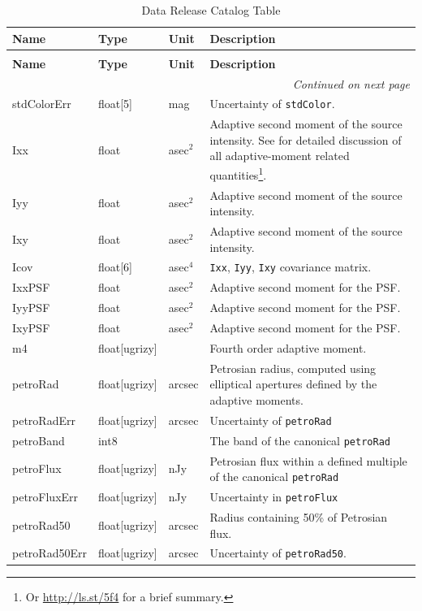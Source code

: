 \documentclass[SE,lsstdraft,toc]{lsstdoc}
\newenvironment{schema}[3]{%
\setlength\LTleft{0pt}
\setlength\LTright{\fill}
\begin{longtable}{p{0.2\textwidth}p{0.14\textwidth}p{0.14\textwidth}p{0.41\textwidth}}

\caption[#1]{#2\label{#3}}\\

\hline \textbf{Name} & \textbf{Type} & \textbf{Unit} & \textbf{Description}\\ \hline
\endfirsthead

\caption[#1]{#2}\\

\hline \textbf{Name} & \textbf{Type} & \textbf{Unit} & \textbf{Description}\\ \hline
\endhead

\hline \multicolumn{4}{r}{\emph{Continued on next page}} \\
\endfoot

\hline\hline
\endlastfoot
}{%
\hline
\end{longtable}
}
\begin{document}
\begin{schema}{\Object Table}{Data Release Catalog \Object Table}{tbl:objectTable}
stdColorErr & float[5] & mag & Uncertainty of \texttt{stdColor}. \\

Ixx & float & asec$^{2}$ & Adaptive second moment of the source intensity. See \citet{2002AJ....123..583B} for detailed discussion of all adaptive-moment related quantities\footnote{Or \url{http://ls.st/5f4} for a brief summary.}. \\

Iyy & float & asec$^{2}$ & Adaptive second moment of the source intensity. \\

Ixy & float & asec$^{2}$ & Adaptive second moment of the source intensity. \\

Icov & float[6] & asec$^{4}$ & \texttt{Ixx}, \texttt{Iyy}, \texttt{Ixy} covariance matrix. \\

IxxPSF & float & asec$^{2}$ & Adaptive second moment for the PSF. \\

IyyPSF & float & asec$^{2}$ & Adaptive second moment for the PSF. \\

IxyPSF & float & asec$^{2}$ & Adaptive second moment for the PSF. \\

m4 & float[ugrizy] & ~ & Fourth order adaptive moment. \\


petroRad & float[ugrizy] & arcsec & Petrosian radius, computed using elliptical apertures defined by the adaptive moments. \\

petroRadErr & float[ugrizy] & arcsec & Uncertainty of \texttt{petroRad} \\

petroBand & int8 & ~ & The band of the canonical \texttt{petroRad} \\

petroFlux & float[ugrizy] & nJy & Petrosian flux within a defined multiple of the canonical \texttt{petroRad} \\

petroFluxErr & float[ugrizy] & nJy & Uncertainty in \texttt{petroFlux} \\

petroRad50 & float[ugrizy] & arcsec & Radius containing 50\% of Petrosian flux. \\

petroRad50Err & float[ugrizy] & arcsec & Uncertainty of \texttt{petroRad50}. \\


\end{schema}
\end{document}
